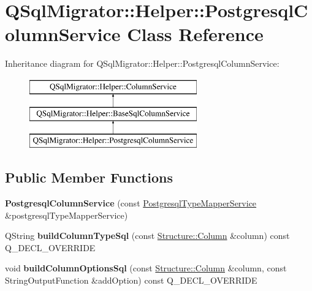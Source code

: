\hypertarget{class_q_sql_migrator_1_1_helper_1_1_postgresql_column_service}{}\section{Q\+Sql\+Migrator\+:\+:Helper\+:\+:Postgresql\+Column\+Service Class Reference}
\label{class_q_sql_migrator_1_1_helper_1_1_postgresql_column_service}
Inheritance diagram for Q\+Sql\+Migrator\+:\+:Helper\+:\+:Postgresql\+Column\+Service\+:\begin{figure}[H]
\begin{center}
\leavevmode
\includegraphics[height=3.000000cm]{class_q_sql_migrator_1_1_helper_1_1_postgresql_column_service}
\end{center}
\end{figure}
\subsection*{Public Member Functions}
\begin{DoxyCompactItemize}
\item 
\mbox{\label{class_q_sql_migrator_1_1_helper_1_1_postgresql_column_service_a746cf88a091650da5d760fa73f209868}} 
{\bfseries Postgresql\+Column\+Service} (const \hyperlink{class_q_sql_migrator_1_1_helper_1_1_postgresql_type_mapper_service}{Postgresql\+Type\+Mapper\+Service} \&postgresql\+Type\+Mapper\+Service)
\item 
\mbox{\label{class_q_sql_migrator_1_1_helper_1_1_postgresql_column_service_a618e78de0da70738f3805ad25b2c8c88}} 
Q\+String {\bfseries build\+Column\+Type\+Sql} (const \hyperlink{class_q_sql_migrator_1_1_structure_1_1_column}{Structure\+::\+Column} \&column) const Q\+\_\+\+D\+E\+C\+L\+\_\+\+O\+V\+E\+R\+R\+I\+DE
\item 
\mbox{\label{class_q_sql_migrator_1_1_helper_1_1_postgresql_column_service_ae555a3268213523f231f856e095a9ed8}} 
void {\bfseries build\+Column\+Options\+Sql} (const \hyperlink{class_q_sql_migrator_1_1_structure_1_1_column}{Structure\+::\+Column} \&column, const String\+Output\+Function \&add\+Option) const Q\+\_\+\+D\+E\+C\+L\+\_\+\+O\+V\+E\+R\+R\+I\+DE
\end{DoxyCompactItemize}
